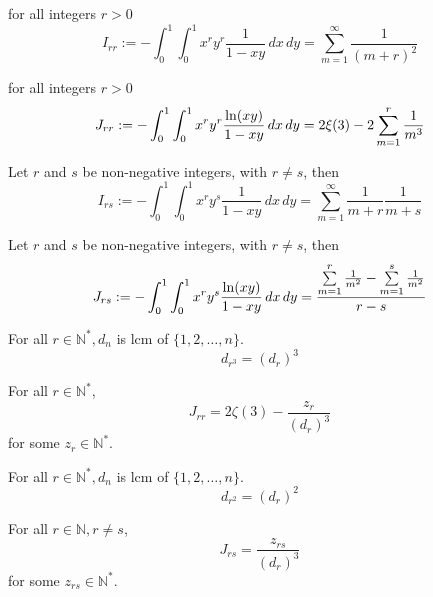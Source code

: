 \begin{lemma}\label{I_rr}
    for all integers $r > 0$
    \[ I_{rr} := -\int_{0}^{1}\int_{0}^{1} x^ry^r\frac{1}{1-xy} \, dx \, dy = \sum\limits_{m = 1}^{\infty}\frac{1}{(m+r)^2} \]
\end{lemma}

\begin{lemma}\label{J_rr}
    for all integers $r > 0$
    \[ J_{rr} := -\int_{0}^{1}\int_{0}^{1} x^ry^r\frac{{\rm ln}(xy)}{1-xy} \, dx \, dy = 2\xi(3) - 2 \sum\limits_{m = 1}^{r}\frac{1}{m^3} \]
\end{lemma}

\begin{lemma}\label{I_rs}
    Let $r$ and $s$ be non-negative integers, with $r \neq s$, then
    \[ I_{rs} := -\int_{0}^{1}\int_{0}^{1} x^ry^s\frac{1}{1-xy} \, dx \, dy = \sum\limits_{m = 1}^{\infty}\frac{1}{m+r}\frac{1}{m+s} \]
\end{lemma}

\begin{lemma}\label{J_rs}
    Let $r$ and $s$ be non-negative integers, with $r \neq s$, then
    \[ J_{rs} := -\int_{0}^{1}\int_{0}^{1} x^ry^s\frac{{\rm ln}(xy)}{1-xy} \, dx \, dy = \frac{\sum\limits_{m = 1}^{r}\frac{1}{m^2} - \sum\limits_{m = 1}^{s}\frac{1}{m^2}}{r - s} \]
\end{lemma}

\begin{lemma}\label{d_r_3}
    For all $r \in \mathbb{N}^*, d_n$ is lcm of $\{1, 2, \ldots, n\}.$ 
    \[ d_{r^3} = (d_r)^3 \]
\end{lemma}

\begin{lemma}\label{Jrr_linear_form}
    For all $r \in \mathbb{N}^*$,
    \[ J_{rr} = 2 \zeta(3) - \frac{z_r}{(d_r)^3} \]
    for some $z_r \in \mathbb{N}^*$.
\end{lemma}

\begin{lemma}\label{d_r_2}
    For all $r \in \mathbb{N}^*, d_n$ is lcm of $\{1, 2, \ldots, n\}.$ 
    \[ d_{r^2} = (d_r)^2 \]
\end{lemma}

\begin{lemma}\label{Jrs_postive_rational}
    For all $r \in \mathbb{N}, r \neq s$,
    \[ J_{rs} = \frac{z_{rs}}{(d_r)^3}\]
    for some $z_{rs} \in \mathbb{N}^*$.
\end{lemma}

